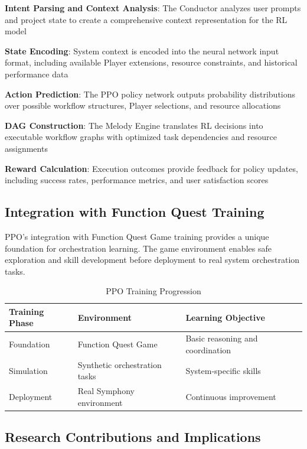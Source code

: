 \begin{expandedlist}
    \item \textbf{Intent Parsing and Context Analysis}: The Conductor analyzes user prompts and project state to create a comprehensive context representation for the RL model
    \item \textbf{State Encoding}: System context is encoded into the neural network input format, including available Player extensions, resource constraints, and historical performance data
    \item \textbf{Action Prediction}: The PPO policy network outputs probability distributions over possible workflow structures, Player selections, and resource allocations
    \item \textbf{DAG Construction}: The Melody Engine translates RL decisions into executable workflow graphs with optimized task dependencies and resource assignments
    \item \textbf{Reward Calculation}: Execution outcomes provide feedback for policy updates, including success rates, performance metrics, and user satisfaction scores
\end{expandedlist}

\subsection*{Integration with Function Quest Training}

PPO's integration with Function Quest Game training provides a unique foundation for orchestration learning. The game environment enables safe exploration and skill development before deployment to real system orchestration tasks.

\begin{table}[ht]
\centering
\begin{tabular}{@{}lll@{}}
\toprule
\textbf{Training Phase} & \textbf{Environment} & \textbf{Learning Objective} \\
\midrule
Foundation & Function Quest Game & Basic reasoning and coordination \\
Simulation & Synthetic orchestration tasks & System-specific skills \\
Deployment & Real Symphony environment & Continuous improvement \\
\bottomrule
\end{tabular}
\caption{PPO Training Progression}
\end{table}

\subsection*{Research Contributions and Implications}

